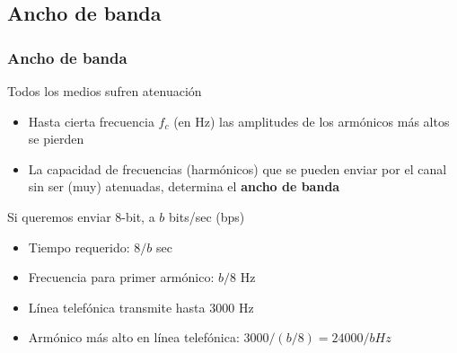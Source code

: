 \documentclass[letter]{beamer}
\begin{document}
\subsection{Ancho de banda}

\begin{frame}
  \frametitle{Ancho de banda}

  Todos los medios sufren atenuación
  \begin{itemize}
    \item Hasta cierta frecuencia $f_c$ (en Hz) las amplitudes de los armónicos más altos se pierden
    \item La capacidad de frecuencias (harmónicos) que se pueden enviar por el canal
          sin ser (muy) atenuadas, determina el {\bf ancho de banda}
  \end{itemize}
  Si queremos enviar $8$-bit, a $b$ bits/sec (bps)
  \begin{itemize}
    \item Tiempo requerido: $8/b$ sec
    \item Frecuencia para primer armónico: $b/8$ Hz
    \item Línea telefónica transmite hasta $3000$ Hz
    \item Armónico más alto en línea telefónica: $3000/(b/8)=24000/b Hz$
  \end{itemize}

\end{frame}
\end{document}
